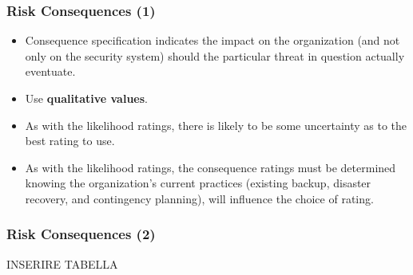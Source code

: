 \documentclass[xcolor ={table,usenames,dvipsnames}]{beamer}
\theoremstyle{definition}
\begin{document}
	\begin{frame}
		\frametitle{Risk Consequences (1)}
		\begin{itemize}
			\item Consequence specification indicates the impact on the organization (and not only on the security system) should the particular threat in question actually eventuate.
			\item Use \textbf{qualitative values}.
			\item As with the likelihood ratings, there is likely to be some uncertainty as to the best rating to use.
			\item As with the likelihood ratings, the consequence ratings must be determined knowing the organization’s current practices (existing backup, disaster recovery, and contingency planning), will influence the choice of rating.
		\end{itemize}
	\end{frame}
	
	
	\begin{frame}
		\frametitle{Risk Consequences (2)}
		INSERIRE TABELLA
	\end{frame}
	
\end{document}
